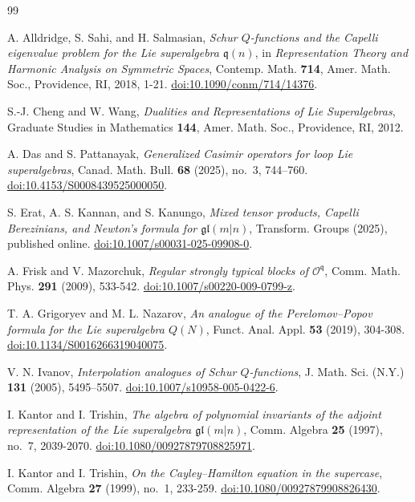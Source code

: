 \documentclass[11pt]{amsart}
\numberwithin{equation}{section}
\theoremstyle{definition}
\theoremstyle{remark}
\newcommand{\gl}{\mathfrak{gl}}
\begin{document}
\begin{thebibliography}{99}

A. Alldridge, S. Sahi, and H. Salmasian,
\emph{Schur \(Q\)-functions and the Capelli eigenvalue problem for the
Lie superalgebra \(\mathfrak q(n)\)},
in \emph{Representation Theory and Harmonic Analysis on Symmetric
Spaces}, Contemp. Math. \textbf{714}, Amer. Math. Soc., Providence,
RI, 2018, 1-21.
\href{https://doi.org/10.1090/conm/714/14376}
{doi:10.1090/conm/714/14376}.

S.-J. Cheng and W. Wang,
\emph{Dualities and Representations of Lie Superalgebras},
Graduate Studies in Mathematics \textbf{144}, Amer. Math. Soc.,
Providence, RI, 2012.

A. Das and S. Pattanayak,
\emph{Generalized Casimir operators for loop Lie superalgebras},
Canad. Math. Bull. \textbf{68} (2025), no.~3, 744--760.
\href{https://doi.org/10.4153/S0008439525000050}
{doi:10.4153/S0008439525000050}.

S. Erat, A. S. Kannan, and S. Kanungo,
\emph{Mixed tensor products, Capelli Berezinians, and Newton's formula
for \(\mathfrak{gl}(m|n)\)},
Transform. Groups (2025), published online.
\href{https://doi.org/10.1007/s00031-025-09908-0}
{doi:10.1007/s00031-025-09908-0}.

A. Frisk and V. Mazorchuk,
\emph{Regular strongly typical blocks of \(\mathcal O^{\mathfrak q}\)},
Comm. Math. Phys. \textbf{291} (2009), 533-542.
\href{https://doi.org/10.1007/s00220-009-0799-z}
{doi:10.1007/s00220-009-0799-z}.

T. A. Grigoryev and M. L. Nazarov,
\emph{An analogue of the Perelomov--Popov formula for the Lie
superalgebra \(Q(N)\)},
Funct. Anal. Appl. \textbf{53} (2019), 304-308.
\href{https://doi.org/10.1134/S0016266319040075}
{doi:10.1134/S0016266319040075}.

V. N. Ivanov,
\emph{Interpolation analogues of Schur \(Q\)-functions},
J. Math. Sci. (N.Y.) \textbf{131} (2005), 5495--5507.
\href{https://doi.org/10.1007/s10958-005-0422-6}
{doi:10.1007/s10958-005-0422-6}.

I. Kantor and I. Trishin,
\emph{The algebra of polynomial invariants of the adjoint
representation of the Lie superalgebra \(\gl(m|n)\)},
Comm. Algebra \textbf{25} (1997), no.~7, 2039-2070.
\href{https://doi.org/10.1080/00927879708825971}
{doi:10.1080/00927879708825971}.

I. Kantor and I. Trishin,
\emph{On the Cayley--Hamilton equation in the supercase},
Comm. Algebra \textbf{27} (1999), no.~1, 233-259.
\href{https://doi.org/10.1080/00927879908826430}
{doi:10.1080/00927879908826430}.


\end{thebibliography}
\end{document}
